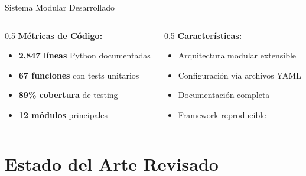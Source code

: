 \documentclass[aspectratio=169]{beamer}
\begin{document}
\begin{frame}{Sistema Modular Desarrollado}
\begin{center}
  \end{center}
  
  \vspace{0.3cm}
  \begin{columns}
    \begin{column}{0.5\textwidth}
      \textbf{Métricas de Código:}
      \begin{itemize}
        \item \textbf{2,847 líneas} Python documentadas
        \item \textbf{67 funciones} con tests unitarios
        \item \textbf{89\% cobertura} de testing
        \item \textbf{12 módulos} principales
      \end{itemize}
    \end{column}
    \begin{column}{0.5\textwidth}
      \textbf{Características:}
      \begin{itemize}
        \item Arquitectura modular extensible
        \item Configuración vía archivos YAML
        \item Documentación completa
        \item Framework reproducible
      \end{itemize}
    \end{column}
  \end{columns}
\end{frame}

\section{Estado del Arte Revisado}
\end{document}
